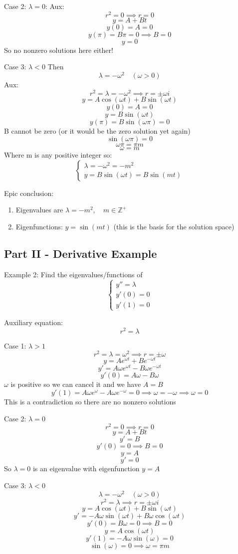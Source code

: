 \documentclass[12pt]{article}
\begin{document}
Case 2: $\lambda = 0$: 
Aux: 
\[r^2 = 0 \implies r = 0\]
\[y = A + Bt\]
\[y(0) = A = 0\]
\[y(\pi) = B\pi = 0 \implies B = 0\]
\[y = 0\]
So no nonzero solutions here either!

Case 3: $\lambda < 0$
Then 
\[\lambda = -\omega^2 \quad (\omega > 0)\]
Aux:
\[r^2 = \lambda = -\omega^2 \implies r = \pm \omega i\]
\[y = A\cos (\omega t) + B \sin (\omega t)\]
\[y(0) = A = 0\]
\[y = B\sin (\omega t)\]
\[y(\pi) = B\sin (\omega \pi) = 0\]
B cannot be zero (or it would be the zero solution yet again)
\[\sin (\omega \pi) = 0\]
\[\omega \pi = \pi m\]
\[\omega = m\]
Where m is any positive integer so:
\[\begin{cases}
    \lambda = -\omega^2 = -m^2\\
    y = B \sin (\omega t) = B \sin(m t)
\end{cases}\]

Epic conclusion:
\begin{enumerate}
    \item Eigenvalues are $\lambda = -m^2, \quad m \in \mathbb{Z}^+$
    \item Eigenfunctions: $y = \sin (mt)$ (this is the basis for the solution space)
\end{enumerate}

\subsection*{Part II - Derivative Example}
Example 2: Find the eigenvalues/functions of 
\[\begin{cases}
    y'' = \lambda\\
    y'(0) = 0\\
    y'(1) = 0
\end{cases}\] 

Auxiliary equation:
\[r^2 = \lambda\]

Case 1: $\lambda > 1$
\[r^2 = \lambda = \omega^2 \implies r = \pm \omega\]
\[y = Ae^{\omega t} + Be^{-\omega t}\]
\[y' = A\omega e^{\omega t} -B\omega e^{-\omega t} \]
\[y'(0) = A\omega -B\omega\]
$\omega$ is positive so we can cancel it and we have $A= B$
\[y'(1) = A\omega e^\omega - A\omega e^{-\omega} = 0 \implies \omega = -\omega \implies \omega = 0\]
This is a contradiction so there are no nonzero solutions

Case 2: $\lambda = 0$
\[r^2 = 0 \implies r = 0\]
\[y = A + Bt\]
\[y' = B\]
\[y'(0) = 0 \implies B = 0\]
\[y = A\]
\[y' = 0\]
So $\lambda = 0$ is an eigenvalue with eigenfunction $y = A$ 

Case 3: $\lambda < 0$
\[\lambda = -\omega^2 \quad (\omega > 0)\]
\[r^2 = \lambda \implies r = \pm \omega i\]
\[y = A \cos (\omega t) + B \sin (\omega t)\]
\[y' = -A \omega \sin (\omega t) + B \omega \cos (\omega t) \]
\[y'(0) = B \omega = 0 \implies B = 0\]
\[y = A \cos (\omega t)\]
\[y'(1) = -A\omega \sin (\omega) = 0\]
\[\sin (\omega) = 0 \implies \omega = \pi m \]
\end{document}
